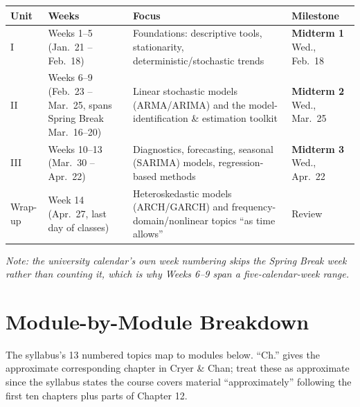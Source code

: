 \documentclass[11pt]{article}
\begin{document}
\renewcommand{\arraystretch}{1.3}
\begin{longtable}{p{1.6cm} p{3.0cm} p{6.3cm} p{2.9cm}}
\toprule
\textbf{Unit} & \textbf{Weeks} & \textbf{Focus} & \textbf{Milestone} \\
\midrule
\endhead
I &
  Weeks 1--5 (Jan.\ 21 -- Feb.\ 18) &
  Foundations: descriptive tools, stationarity, deterministic/stochastic trends &
  \textbf{Midterm 1} \newline Wed., Feb.\ 18 \\
II &
  Weeks 6--9 (Feb.\ 23 -- Mar.\ 25, spans Spring Break Mar.\ 16--20) &
  Linear stochastic models (ARMA/ARIMA) and the model-identification \& estimation toolkit &
  \textbf{Midterm 2} \newline Wed., Mar.\ 25 \\
III &
  Weeks 10--13 (Mar.\ 30 -- Apr.\ 22) &
  Diagnostics, forecasting, seasonal (SARIMA) models, regression-based methods &
  \textbf{Midterm 3} \newline Wed., Apr.\ 22 \\
Wrap-up &
  Week 14 (Apr.\ 27, last day of classes) &
  Heteroskedastic models (ARCH/GARCH) and frequency-domain/nonlinear topics ``as time allows'' &
  Review \\
\bottomrule
\end{longtable}

\textit{Note: the university calendar's own week numbering skips the Spring Break week rather than
counting it, which is why Weeks 6--9 span a five-calendar-week range.}

\section{Module-by-Module Breakdown}

The syllabus's 13 numbered topics map to modules below. ``Ch.'' gives the approximate corresponding
chapter in Cryer \& Chan; treat these as approximate since the syllabus states the course covers
material ``approximately'' following the first ten chapters plus parts of Chapter 12.
\end{document}
